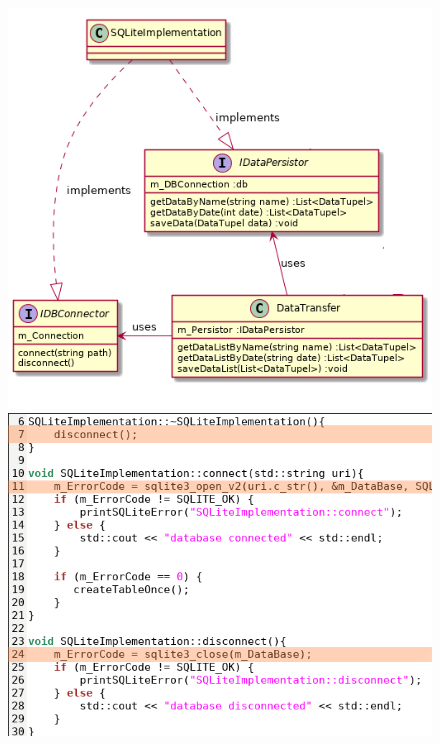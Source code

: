 \begin{frame}
\begin{columns}[c]
\begin{figure}
\begin{overprint}
                \includegraphics[width=.8\textwidth]{cppfeature_isp.png}
                \includegraphics[width=\textwidth]{raii.png}
            \end{overprint}
        \end{figure}
       
    \end{columns}
\end{frame}

